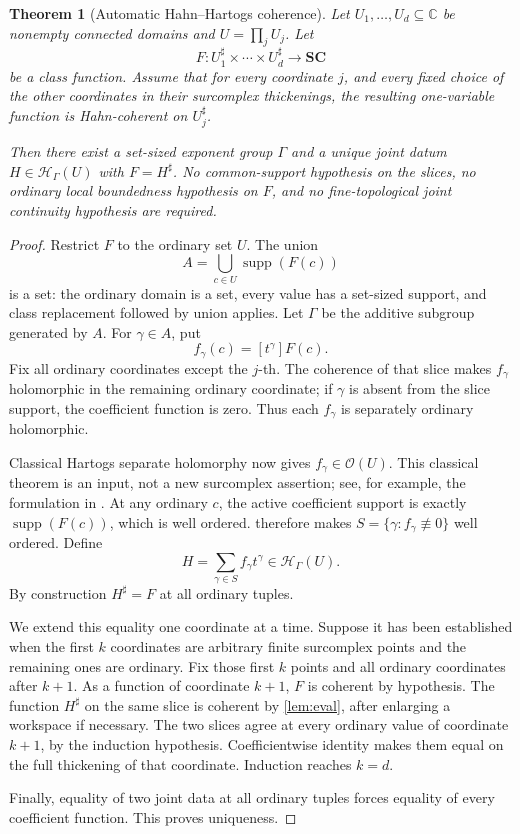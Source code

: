 \documentclass[11pt,oneside]{article}
\numberwithin{equation}{section}
\newtheorem{theorem}{Theorem}[section]
\theoremstyle{definition}
\theoremstyle{remark}\newtheorem{remark}[theorem]{Remark}
\newcommand{\C}{\mathbb C}
\newcommand{\SC}{\mathbf{SC}}
\newcommand{\OO}{\mathcal O}
\newcommand{\HH}{\mathcal H_{\Gamma}}
\newcommand{\sh}{^{\sharp}}
\newcommand{\supp}{\operatorname{supp}}
\begin{document}
\begin{theorem}[Automatic Hahn--Hartogs coherence]\label{thm:hartogs}
Let \(U_1,\ldots,U_d\subseteq\C\) be nonempty connected domains and \(U=\prod_jU_j\). Let
\[
 F:U_1\sh\times\cdots\times U_d\sh\longrightarrow\SC
\]
be a class function. Assume that for every coordinate \(j\), and every fixed choice of the other coordinates in their surcomplex thickenings, the resulting one-variable function is Hahn-coherent on \(U_j\sh\).

Then there exist a set-sized exponent group \(\Gamma\) and a unique joint datum \(H\in\HH(U)\) with \(F=H\sh\). No common-support hypothesis on the slices, no ordinary local boundedness hypothesis on \(F\), and no fine-topological joint continuity hypothesis are required.
\end{theorem}
\begin{proof}
Restrict \(F\) to the ordinary set \(U\). The union
\[
 A=\bigcup_{c\in U}\supp(F(c))
\]
is a set: the ordinary domain is a set, every value has a set-sized support, and class replacement followed by union applies. Let \(\Gamma\) be the additive subgroup generated by \(A\). For \(\gamma\in A\), put
\[
 f_\gamma(c)=[t^\gamma]F(c).
\]
Fix all ordinary coordinates except the \(j\)-th. The coherence of that slice makes \(f_\gamma\) holomorphic in the remaining ordinary coordinate; if \(\gamma\) is absent from the slice support, the coefficient function is zero. Thus each \(f_\gamma\) is separately ordinary holomorphic.

Classical Hartogs separate holomorphy now gives \(f_\gamma\in\OO(U)\). This classical theorem is an input, not a new surcomplex assertion; see, for example, the formulation in \cite{BK}. At any ordinary \(c\), the active coefficient support is exactly \(\supp(F(c))\), which is well ordered.  therefore makes
\(S=\{\gamma:f_\gamma\not\equiv0\}\) well ordered. Define
\[
 H=\sum_{\gamma\in S}f_\gamma t^\gamma\in\HH(U).
\]
By construction \(H\sh=F\) at all ordinary tuples.

We extend this equality one coordinate at a time. Suppose it has been established when the first \(k\) coordinates are arbitrary finite surcomplex points and the remaining ones are ordinary. Fix those first \(k\) points and all ordinary coordinates after \(k+1\). As a function of coordinate \(k+1\), \(F\) is coherent by hypothesis. The function \(H\sh\) on the same slice is coherent by \cref{lem:eval}, after enlarging a workspace if necessary. The two slices agree at every ordinary value of coordinate \(k+1\), by the induction hypothesis. Coefficientwise identity makes them equal on the full thickening of that coordinate. Induction reaches \(k=d\).

Finally, equality of two joint data at all ordinary tuples forces equality of every coefficient function. This proves uniqueness.
\end{proof}
\end{document}
